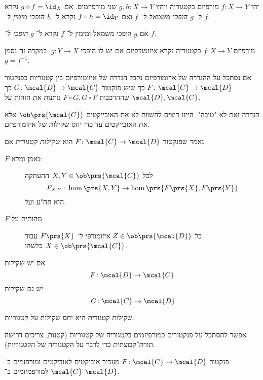 \documentclass[10pt, twoside]{book}
\begin{document}
\begin{definition}
יהי
$f \colon X \to Y$
מורפיזם בקטגוריה ויהיו
$g,h \colon X \to Y$
שני מורפיזמים.
אם
$g \circ f = \id_X$
נקרא ל־%
$g$
\emph{הופכי משמאל ל־%
$f$}
ואם
$f \circ h = \id_Y$
נקרא ל־%
$h$
\emph{הופכי מימין ל־%
$f$}.

אם
$g$
הופכי משמאל ומימין ל־%
$f$
נקרא ל־%
$g$
\emph{הופכי ל־%
$f$}.
\end{definition}

\begin{definition}[איזומורפיזם]
מורפיזם
$f \colon X \to Y$
בקטגוריה נקרא
\emph{איזומורפיזם}
אם יש לו הופכי
$g \colon Y \to X$.
במקרה זה נסמן
$g = f^{-1}$.
\end{definition}

\begin{remark}
אם נסתכל על ההגדרה של איזומורפיזם נקבל הגדרה של איזומורפיזם בין קטגוריות כפנקטור
$F \colon \mcal{C} \to \mcal{D}$
כך שיש פנקטור
$G \colon \mcal{D} \to \mcal{C}$
כך שההרכבות
$F \circ G, G \circ F$
נותנות את הזהות על
$\mcal{D}, \mcal{C}$.

הגדרה זאת לא "טובה". היינו רוצים להשוות לא את האובייקטים
$\ob\prs{\mcal{C}}$
אלא את האובייקטים עד כדי יחס שקילות של איזומורפיזם.
\end{remark}

\begin{definition}
נאמר שפנקטור
$F \colon \mcal{C} \to \mcal{D}$
הוא
\emph{שקילות קטגורית}
אם
\begin{description}
\item[$F$ נאמן ומלא:]
 לכל
$X,Y \in \ob\prs{\mcal{C}}$
ההעתקה
\[F_{X,Y} \colon \hom\prs{X,Y} \to \hom\prs{F\prs{X}, F\prs{Y}}\]
היא חח"ע ועל.
\item[$F$ מהותית על] 
כל
$Z \in \ob\prs{\mcal{D}}$
איזומורפי ל־%
$F\prs{X}$
עבור
$X \in \ob\prs{\mcal{C}}$
כלשהו.
\end{description}
\end{definition}

\begin{exercise}
אם יש שקילות
\[F \colon \mcal{D} \to \mcal{C}\]
יש גם שקילות
\[\text{.} G \colon \mcal{C} \to \mcal{D}\]
\end{exercise}

\begin{exercise}
שקילות קטגורית היא יחס שקילות על קטגוריות.
\end{exercise}

\begin{remark}
אפשר להסתכל על פנקטורים כמורפיזמים בקטגוריה של קטגוריות (קטנות, צריכים דרישה תורת־קבוצתית כדי לדבר על הקטגוריה של הקטגוריות).

פנקטור
$F \colon \mcal{C} \to \mcal{D}$
מעביר אוביקטים לאוביקטים ומורפזמים ב־%
$\mcal{C}$
למורפמיזמים ב־%
$\mcal{D}$.
\end{remark}
\end{document}
